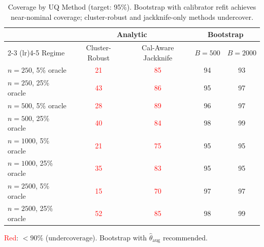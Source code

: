 \begin{table}[t]
\centering
\caption{Coverage by UQ Method (target: 95\%). Bootstrap with calibrator refit achieves near-nominal coverage; cluster-robust and jackknife-only methods undercover.}
\label{tab:uq-comparison}
\small
\setlength{\tabcolsep}{4pt}
\begin{tabular}{lcccc}
\toprule
& \multicolumn{2}{c}{Analytic} & \multicolumn{2}{c}{Bootstrap} \\
\cmidrule(lr){2-3} \cmidrule(lr){4-5}
Regime & Cluster-Robust & Cal-Aware Jackknife & $B{=}500$ & $B{=}2000$ \\
\midrule
$n{=}250$, 5\% oracle & \textcolor{red}{21} & \textcolor{red}{85} & 94 & 93 \\
$n{=}250$, 25\% oracle & \textcolor{red}{43} & \textcolor{red}{86} & 95 & 97 \\
$n{=}500$, 5\% oracle & \textcolor{red}{28} & \textcolor{red}{89} & 96 & 97 \\
$n{=}500$, 25\% oracle & \textcolor{red}{40} & \textcolor{red}{84} & 98 & 99 \\
$n{=}1000$, 5\% oracle & \textcolor{red}{21} & \textcolor{red}{75} & 95 & 95 \\
$n{=}1000$, 25\% oracle & \textcolor{red}{35} & \textcolor{red}{83} & 95 & 95 \\
$n{=}2500$, 5\% oracle & \textcolor{red}{15} & \textcolor{red}{70} & 97 & 97 \\
$n{=}2500$, 25\% oracle & \textcolor{red}{52} & \textcolor{red}{85} & 98 & 99 \\
\bottomrule
\end{tabular}

\vspace{1mm}
\footnotesize{\textcolor{red}{Red}: $< 90\%$ (undercoverage). Bootstrap with $\hat\theta_{\mathrm{aug}}$ recommended.}
\end{table}
